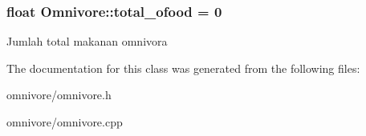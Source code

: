 \subsubsection[{\texorpdfstring{total\+\_\+ofood}{total_ofood}}]{\setlength{\rightskip}{0pt plus 5cm}float Omnivore\+::total\+\_\+ofood = 0\hspace{0.3cm}{\ttfamily [static]}}\hypertarget{classOmnivore_ac4e106c20ef52747fb78f22765beaa64}{}\label{classOmnivore_ac4e106c20ef52747fb78f22765beaa64}
Jumlah total makanan omnivora 

The documentation for this class was generated from the following files\+:\begin{DoxyCompactItemize}
\item 
omnivore/omnivore.\+h\item 
omnivore/omnivore.\+cpp\end{DoxyCompactItemize}
